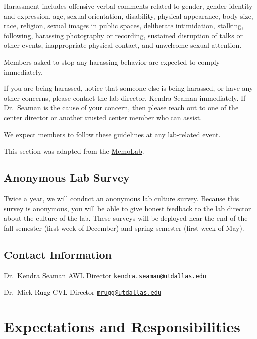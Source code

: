 \documentclass[
]{book}
\begin{document}
Harassment includes offensive verbal comments related to gender, gender identity and expression, age, sexual orientation, disability, physical appearance, body size, race, religion, sexual images in public spaces, deliberate intimidation, stalking, following, harassing photography or recording, sustained disruption of talks or other events, inappropriate physical contact, and unwelcome sexual attention.

Members asked to stop any harassing behavior are expected to comply immediately.

If you are being harassed, notice that someone else is being harassed, or have any other concerns, please contact the lab director, Kendra Seaman immediately. If Dr.~Seaman is the cause of your concern, then please reach out to one of the center director or another trusted center member who can assist.

We expect members to follow these guidelines at any lab-related event.

This section was adapted from the \href{https://github.com/memobc/memolab-manual\#code-of-conduct}{MemoLab}.

\hypertarget{anonymous-lab-survey}{%
\section{Anonymous Lab Survey}\label{anonymous-lab-survey}}

Twice a year, we will conduct an anonymous lab culture survey. Because this survey is anonymous, you will be able to give honest feedback to the lab director about the culture of the lab. These surveys will be deployed near the end of the fall semester (first week of December) and spring semester (first week of May).

\hypertarget{contact-information}{%
\section{Contact Information}\label{contact-information}}

Dr.~Kendra Seaman
AWL Director
\href{mailto:kendra.seaman@utdallas.edu}{\nolinkurl{kendra.seaman@utdallas.edu}}

Dr.~Mick Rugg
CVL Director
\href{mailto:mrugg@utdallas.edu}{\nolinkurl{mrugg@utdallas.edu}}

\hypertarget{expectations-and-responsibilities}{%
\chapter{Expectations and Responsibilities}\label{expectations-and-responsibilities}}
\end{document}
